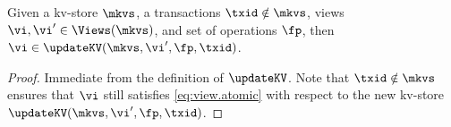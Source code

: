 \begin{lemma}
\label{lem:updatekv.preserveviews}
Given a kv-store $\mkvs$, a transactions $\txid \notin \mkvs$, views $\vi, \vi' \in \Views(\mkvs)$, 
and set of operations $\fp$, then $\vi \in \updateKV(\mkvs, \vi', \fp, \txid)$.
\end{lemma}

\begin{proof}
Immediate from the definition of $\updateKV$. Note that $\txid \notin \mkvs$ ensures that 
$\vi$ still satisfies \eqref{eq:view.atomic} with respect to the new kv-store $\updateKV(\mkvs, \vi', \fp, \txid)$.
\end{proof}
